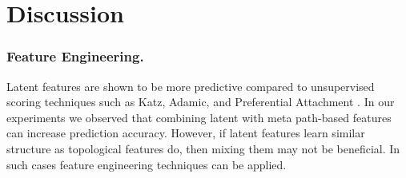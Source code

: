 \section{Discussion}



\subsubsection{Feature Engineering.}  Latent features are shown to be more predictive compared to unsupervised scoring techniques such as Katz, Adamic, and Preferential Attachment \cite{menon2011link,Zhu2016}. In our experiments we observed that combining latent with meta path-based features can increase prediction accuracy. However, if latent features learn similar structure as topological features do, then mixing them may not be beneficial. In such cases feature engineering techniques can be applied. 









